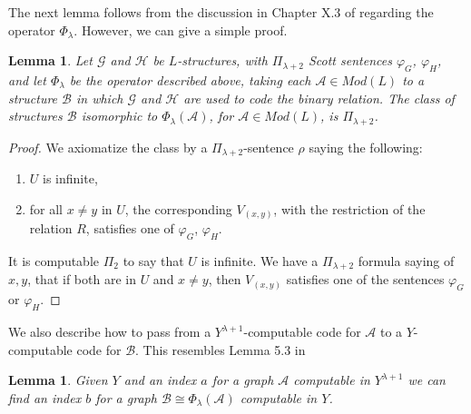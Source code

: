 \documentclass{article}
\newtheorem{lem}[thm]{Lemma}
\begin{document}
\bigskip

The next lemma follows from the discussion in Chapter X.3 of \cite{Mbook2} regarding the operator $\Phi_\lambda$.  However, we can give a simple proof.  

\begin{lem}

Let $\mathcal{G}$ and $\mathcal{H}$ be $L$-structures, with $\Pi_{\lambda+2}$ Scott sentences $\varphi_G$, $\varphi_H$, and let $\Phi_\lambda$ be the operator described above, taking each 
$\mathcal{A}\in Mod(L)$ to a structure $\mathcal{B}$ in which $\mathcal{G}$ and $\mathcal{H}$ are used to code the binary relation.  The class of structures $\mathcal{B}$ isomorphic to $\Phi_\lambda(\mathcal{A})$, for $\mathcal{A}\in Mod(L)$, is $\Pi_{\lambda+2}$.  

\end{lem}

\begin{proof}

We axiomatize the class by a $\Pi_{\lambda+2}$-sentence $\rho$ saying the following:
\begin{enumerate}

\item  $U$ is infinite,

\item  for all $x\not= y$ in $U$, the corresponding $V_{(x,y)}$, with the restriction of the relation $R$, satisfies one of $\varphi_G$, $\varphi_H$.

\end{enumerate}
It is computable $\Pi_2$ to say that $U$ is infinite.  We have a $\Pi_{\lambda+2}$ formula saying of $x,y$, that if both are in $U$ and $x\not= y$, then $V_{(x,y)}$ satisfies one of the sentences $\varphi_G$ or $\varphi_H$.
\end{proof}

We also describe how to pass from a $Y^{\lambda+1}$-computable code for $\mathcal{A}$ to a $Y$-computable code for $\mathcal{B}$.
This resembles Lemma 5.3 in \cite{CGHT}

\begin{lem}
Given $Y$ and an index $a$ for a graph $\mathcal{A}$ computable in $Y^{\lambda+1}$ we can find an index $b$ for a graph $\mathcal{B}\cong\Phi_\lambda(\mathcal{A})$ computable in $Y$.
\end{lem}
\end{document}
